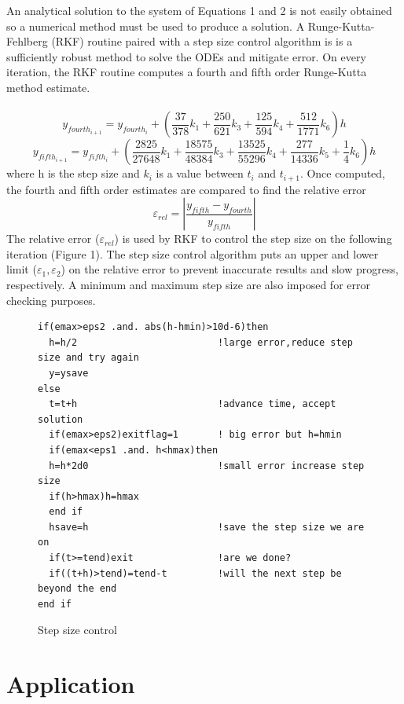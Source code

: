 \documentclass[titlepage,11pt]{article}
\begin{document}
An analytical solution to the system of Equations 1 and 2 is not
easily obtained so a numerical method must be used to produce a
solution. A Runge-Kutta-Fehlberg (RKF) routine paired with a step
size control algorithm is is a sufficiently robust method to solve
the ODEs and mitigate error.  On every iteration, the RKF routine
computes a fourth and
fifth order Runge-Kutta method estimate.\\\\
$$y_{fourth_{i+1}}=y_{fourth_{i}}+\left(\frac{37}{378}k_1+\frac{250}{621}k_3+
\frac{125}{594}k_4+\frac{512}{1771}k_6\right)h$$
$$y_{fifth_{i+1}}=y_{fifth_{i}}+\left(\frac{2825}{27648}k_1+\frac{18575}{48384}k_3+
\frac{13525}{55296}k_4+\frac{277}{14336}k_5+\frac{1}{4}k_6\right)h$$
where h is the step size and $k_i$ is a value between $t_i$ and
$t_{i+1}$.  Once computed, the fourth and fifth order estimates are
compared to find the relative error
$$\varepsilon_{rel}=\left|\frac{y_{fifth}-y_{fourth}}{y_{fifth}}\right|$$
The relative error ($\varepsilon_{rel}$) is used by RKF to control
the step size on the following iteration (Figure 1). The step size
control algorithm puts an upper and lower limit
($\varepsilon_1,\varepsilon_2$) on the relative error to prevent
inaccurate results and slow progress, respectively. A minimum and
maximum step size are also imposed for error checking purposes.

\begin{figure}[h] \label{fig:stop}
\begin{center}
\begin{Verbatim}[frame=single]
if(emax>eps2 .and. abs(h-hmin)>10d-6)then
  h=h/2                         !large error,reduce step size and try again
  y=ysave
else
  t=t+h                         !advance time, accept solution
  if(emax>eps2)exitflag=1       ! big error but h=hmin
  if(emax<eps1 .and. h<hmax)then
  h=h*2d0                       !small error increase step size
  if(h>hmax)h=hmax
  end if
  hsave=h                       !save the step size we are on
  if(t>=tend)exit               !are we done?
  if((t+h)>tend)=tend-t         !will the next step be beyond the end
end if
\end{Verbatim}
\caption{Step size control}
\end{center}
\end{figure}
\section{Application}
\end{document}
